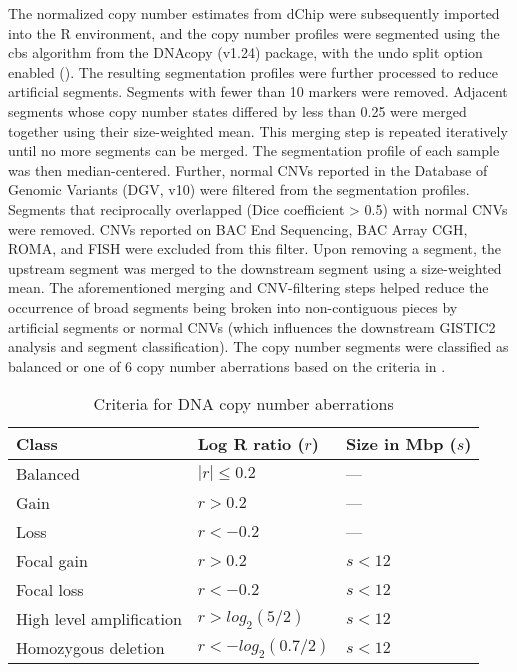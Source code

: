 The normalized copy number estimates from dChip were subsequently imported into the R environment, and the copy number profiles were segmented using the \gls{cbs} algorithm from the DNAcopy (v1.24)  package, with the undo split option enabled (). The resulting segmentation profiles were further processed to reduce artificial segments. Segments with fewer than 10 markers were removed. Adjacent segments whose copy number states differed by less than 0.25 were merged together using their size-weighted mean. This merging step is repeated iteratively until no more segments can be merged. The segmentation profile of each sample was then median-centered. Further, normal CNVs reported in the Database of Genomic Variants (DGV, v10)  were filtered from the segmentation profiles. Segments that reciprocally overlapped (Dice coefficient > 0.5) with normal CNVs were removed. CNVs reported on BAC End Sequencing, BAC Array CGH, ROMA, and FISH were excluded from this filter. Upon removing a segment, the upstream segment was merged to the downstream segment using a size-weighted mean. The aforementioned merging and CNV-filtering steps helped reduce the occurrence of broad segments being broken into non-contiguous pieces by artificial segments or normal CNVs (which influences the downstream GISTIC2 analysis and segment classification). The copy number segments were classified as balanced or one of 6 copy number aberrations based on the criteria in .

\begin{table}[H]
	\caption[Criteria for DNA copy number aberrations]
	{
		Criteria for DNA copy number aberrations
	}
	\label{tab:cna-criteria}
	\footnotesize
	\setlength{\extrarowheight}{0.5em}
	\centering
	\begin{tabular}{l | l | l}
		\hline
		\textbf{Class} & \textbf{Log R ratio ($r$)} & \textbf{Size in Mbp ($s$)} \\
		\hline
		Balanced & $| r | \le 0.2$ & --- \\
		Gain & $r > 0.2$ & --- \\
		Loss & $r < -0.2$ & --- \\
		Focal gain & $r > 0.2$ & $s < 12$ \\
		Focal loss & $r < -0.2$ & $s < 12$ \\
		High level amplification & $r > log_2(5/2)$ & $s < 12$ \\
		Homozygous deletion & $r < -log_2(0.7/2)$ & $s < 12$ \\
		\hline
	\end{tabular}
\end{table}


